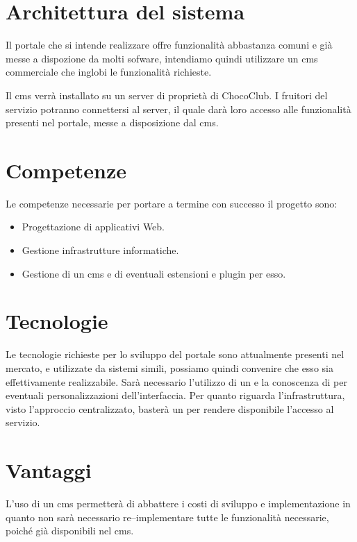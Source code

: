 \section{Architettura del sistema} 
\label{sec:architettura_sistema}
Il portale che si intende realizzare offre funzionalità abbastanza comuni e già messe a dispozione da molti sofware, intendiamo quindi utilizzare un \gls{cms} commerciale che inglobi le funzionalità richieste.

Il \gls{cms} verrà installato su un server di proprietà di ChocoClub.
I fruitori del servizio potranno connettersi al server, il quale darà loro accesso alle funzionalità presenti nel portale, messe a disposizione dal \gls{cms}.

\section{Competenze} 
\label{sec:competenze}
Le competenze necessarie per portare a termine con successo il progetto sono:
\begin{itemize}
	\item Progettazione di applicativi Web.
	\item Gestione infrastrutture informatiche.
	\item Gestione di un \gls{cms} e di eventuali estensioni e plugin per esso.
\end{itemize}

\section{Tecnologie}
\label{sec:tecnologie}
Le tecnologie richieste per lo sviluppo del portale sono attualmente presenti nel mercato, e utilizzate da sistemi simili, possiamo quindi convenire che esso sia effettivamente realizzabile.
Sarà necessario l'utilizzo di un  e la conoscenza di  per eventuali personalizzazioni dell'interfaccia.
Per quanto riguarda l'infrastruttura, visto l'approccio centralizzato, basterà un  per rendere disponibile l'accesso al servizio.

\section{Vantaggi} 
\label{sec:vantaggi}
L'uso di un \gls{cms} permetterà di abbattere i costi di sviluppo e implementazione in quanto non sarà necessario re--implementare tutte le funzionalità necessarie, poiché già disponibili nel \gls{cms}.

